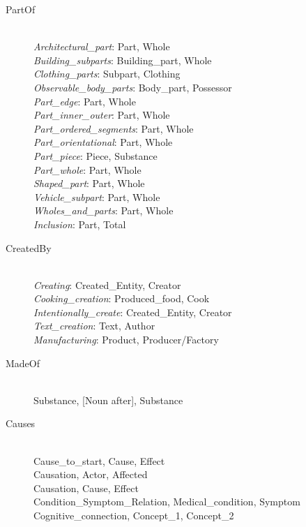 \begin{description}
\item[PartOf] \hfill \\ 
\textit{Architectural_part}: Part, Whole \hfill \\ 
\textit{Building_subparts}: Building_part, Whole \hfill \\ 
\textit{Clothing_parts}: Subpart, Clothing \hfill \\ 
\textit{Observable_body_parts}: Body_part, Possessor \hfill \\ 
\textit{Part_edge}: Part, Whole \hfill \\ 
\textit{Part_inner_outer}: Part, Whole \hfill \\ 
\textit{Part_ordered_segments}: Part, Whole \hfill \\ 
\textit{Part_orientational}: Part, Whole \hfill \\ 
\textit{Part_piece}: Piece, Substance \hfill \\ 
\textit{Part_whole}: Part, Whole \hfill \\ 
\textit{Shaped_part}: Part, Whole \hfill \\ 
\textit{Vehicle_subpart}: Part, Whole \hfill \\ 
\textit{Wholes_and_parts}: Part, Whole \hfill \\ 
\textit{Inclusion}: Part, Total \hfill \\ 

\item[CreatedBy] \hfill \\ 
\textit{Creating}: Created_Entity, Creator \hfill \\ 
\textit{Cooking_creation}: Produced_food, Cook \hfill \\ 
\textit{Intentionally_create}: Created_Entity, Creator \hfill \\ 
\textit{Text_creation}: Text, Author \hfill \\ 
\textit{Manufacturing}: Product, Producer/Factory \hfill \\

\item[MadeOf] \hfill \\ 
Substance, [Noun after], Substance \hfill \\ 

\item[Causes] \hfill \\ 
Cause_to_start, Cause, Effect \hfill \\ 
Causation, Actor,  Affected \hfill \\ 
Causation, Cause,  Effect \hfill \\ 
Condition_Symptom_Relation, Medical_condition, Symptom \hfill \\ 
Cognitive_connection, Concept_1, Concept_2 \hfill \\ 


\end{description}
